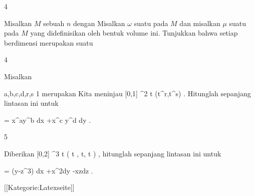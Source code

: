 
{4}
{

Misalkan $M$ sebuah
 $n$
dengan
Misalkan $\omega$ suatu
 pada $M$ dan misalkan $\mu$ suatu
 pada $M$ yang didefinisikan oleh bentuk volume ini. Tunjukkan bahwa setiap
 berdimensi
 merupakan suatu

}
{} {}

{4}
{

Misalkan

\mavergleichskette
{\vergleichskette
{a,b,c,d,r,s
}
{ \geq }{ 1
}
{  }{
}
{    }{
}
{   }{
}
}
{}{}{}
merupakan
Kita meninjau
\maabbeledisp {} { [0,1] } {\R^2
} { t } {(t^r,t^s)
} {.}
Hitunglah
sepanjang lintasan ini untuk

\mavergleichskette
{\vergleichskette
{ \omega
}
{ = }{ x^ay^b dx +x^c y^d dy
}
{  }{
}
{    }{
}
{   }{
}
}
{}{}{.}

}
{} {}

{5}
{

Diberikan
\maabbeledisp {\gamma} { [0,2\pi] } {\R^3
} { t } {( \cos  t , \sin  t, t )
} {,}
hitunglah
sepanjang lintasan ini untuk

\mavergleichskette
{\vergleichskette
{ \omega
}
{ = }{ (y-z^3) dx +x^2dy -xzdz
}
{  }{
}
{    }{
}
{   }{
}
}
{}{}{.}

}
{} {}

 [[Kategorie:Latexseite]]
